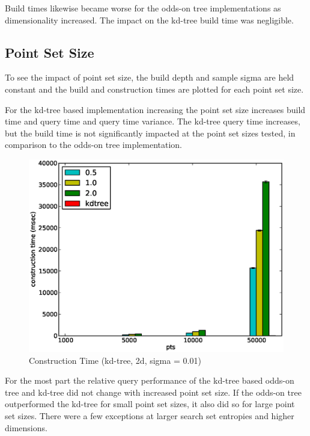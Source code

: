 \documentclass[mcs]{scsthesis}
\begin{document}
Build times likewise became worse for the odds-on tree implementations as
dimensionality increased. The impact on the kd-tree build time was negligible.

\subsection{Point Set Size}

To see the impact of point set size, the build depth and sample sigma are held
constant and the build and construction times are plotted for each point set
size.

For the kd-tree based implementation increasing the point set size increases
build time and query time and query time variance. The kd-tree query time
increases, but the build time is not significantly impacted at the point set
sizes tested, in comparison to the odds-on tree implementation.

\begin{figure}
\begin{center}
\includegraphics[scale=0.5]{diagrams/2d_group_bypts_sigma0.01_ctime.eps}
\caption{Construction Time (kd-tree, 2d, sigma = 0.01)}
\label{fig:point_set_size_ctime}
\end{center}
\end{figure}

For the most part the relative query performance of the kd-tree based odds-on
tree and kd-tree did not change with increased point set size. If the odds-on tree
outperformed the kd-tree for small point set sizes, it also did so for large
point set sizes. There were a few exceptions at larger search set entropies and
higher dimensions.
\end{document}
